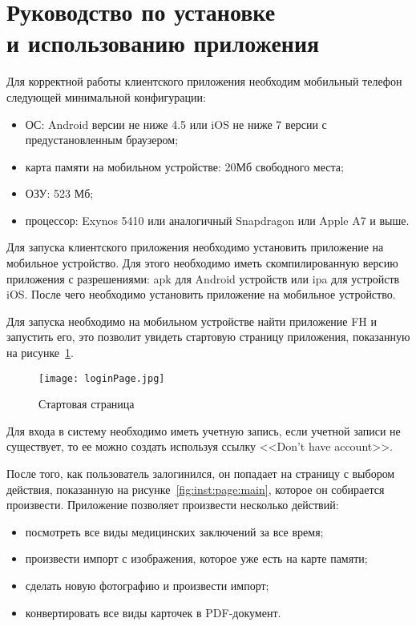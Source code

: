 \section[Руководство по установке и использованию приложения]{Руководство по установке\\ и использованию приложения}
  \label{sec:usage}     \label{sec:usage}
\label{sec:inst}

Для корректной работы клиентского приложения необходим мобильный телефон следующей минимальной конфигурации:

\begin{itemize}
  \item ОС: Android версии не ниже 4.5 или iOS не ниже 7 версии с предустановленным браузером;
  \item карта памяти на мобильном устройстве: 20Мб свободного места;
  \item ОЗУ: 523 Мб;
  \item процессор: Exynos 5410 или аналогичный Snapdragon или Apple A7 и выше.
\end{itemize}

Для запуска клиентского приложения необходимо установить приложение на мобильное устройство. Для этого необходимо иметь скомпилированную версию приложения с разрешениями: apk для Android устройств или ipa для устройств iOS. После чего необходимо установить приложение на мобильное устройство. 

Для запуска необходимо на мобильном устройстве найти приложение FH и запустить его, это позволит увидеть стартовую страницу приложения, показанную на рисунке~\ref{fig:inst:page:login}.

\begin{figure}[ht]
\centering
  \texttt{[image: loginPage.jpg]}  
  \caption{Стартовая страница}
  \label{fig:inst:page:login}
\end{figure}

Для входа в систему необходимо иметь учетную запись, если учетной записи не существует, то ее можно создать используя ссылку <<Don't have account>>.

После того, как пользователь залогинился, он попадает на страницу с выбором действия, показанную на рисунке~\ref{fig:inst:page:main}, которое он собирается произвести. Приложение позволяет произвести несколько действий:
\begin{itemize}
  \item посмотреть все виды медицинских заключений за все время;
  \item произвести импорт с изображения, которое уже есть на карте памяти;
  \item сделать новую фотографию и произвести импорт;
  \item конвертировать все виды карточек в PDF-документ.
\end{itemize}

